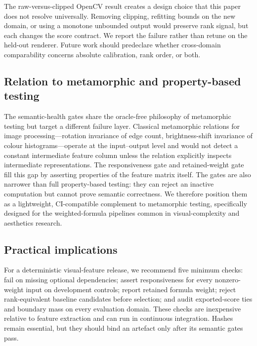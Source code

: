 The raw-versus-clipped OpenCV result creates a design choice that this paper does not resolve universally. Removing clipping, refitting bounds on the new domain, or using a monotone unbounded output would preserve rank signal, but each changes the score contract. We report the failure rather than retune on the held-out renderer. Future work should predeclare whether cross-domain comparability concerns absolute calibration, rank order, or both.

\subsection{Relation to metamorphic and property-based testing}

The semantic-health gates share the oracle-free philosophy of metamorphic testing \citep{guderlei2007statistical,lin2018metamorphic} but target a different failure layer. Classical metamorphic relations for image processing---rotation invariance of edge count, brightness-shift invariance of colour histograms---operate at the input--output level and would not detect a constant intermediate feature column unless the relation explicitly inspects intermediate representations. The responsiveness gate and retained-weight gate fill this gap by asserting properties of the feature matrix itself. The gates are also narrower than full property-based testing: they can reject an inactive computation but cannot prove semantic correctness. We therefore position them as a lightweight, CI-compatible complement to metamorphic testing, specifically designed for the weighted-formula pipelines common in visual-complexity and aesthetics research.

\subsection{Practical implications}

For a deterministic visual-feature release, we recommend five minimum checks: fail on missing optional dependencies; assert responsiveness for every nonzero-weight input on development controls; report retained formula weight; reject rank-equivalent baseline candidates before selection; and audit exported-score ties and boundary mass on every evaluation domain. These checks are inexpensive relative to feature extraction and can run in continuous integration. Hashes remain essential, but they should bind an artefact only after its semantic gates pass.

